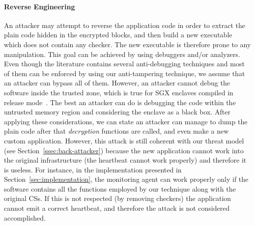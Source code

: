 \paragraph{\textbf{Reverse Engineering}}
An attacker may attempt to reverse the application code in order to extract the 
plain code hidden in the encrypted blocks, and then build a new executable 
which does not contain any checker.
The new executable is therefore prone to any manipulation.
This goal can be achieved by using debuggers and/or analyzers.
Even though the literature contains several anti-debugging techniques and most 
of them can be enforced by using our anti-tampering technique, we assume that 
an attacker can bypass all of them.
However, an attacker cannot debug the software inside the trusted zone, which 
is true for SGX enclaves compiled in release mode~\cite{sgxnodebug}.
The best an attacker can do is debugging the code within the untrusted memory 
region and considering the enclave as a black box.
After applying these considerations, we can state an attacker can manage to 
dump the plain code after that \emph{decryption} functions are called, and even 
make a new custom application.
However, this attack is still coherent with our threat model (see 
Section~\ref{ssec:back-attacker}) because the new application cannot work into 
the original infrastructure (\ie the heartbeat cannot work properly) and 
therefore it is useless.
For instance, in the implementation presented in 
Section~\ref{sec:implementation}, 
the monitoring agent can work properly only if the software contains all the 
functions employed by our technique along with the original CSs.
If this is not respected  (\ie by removing checkers) the application cannot 
emit a correct heartbeat,
and therefore the attack is not considered accomplished.


